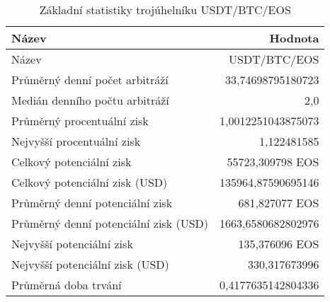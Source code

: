 \begin{table}\centering
\caption{Základní statistiky trojúhelníku USDT/BTC/EOS}
\label{USDTBTCEOS_stats}
\begin{tabular}{|| l | r ||}
\hline Název & Hodnota \\ 
\hline\hline Název & USDT/BTC/EOS \\ 
\hline Průměrný denní počet arbitráží & 33,74698795180723 \\ 
\hline Medián denního počtu arbitráží & 2,0 \\ 
\hline Průměrný procentuální zisk & 1,0012251043875073 \\ 
\hline Nejvyšší procentuální zisk & 1,122481585 \\ 
\hline Celkový potenciální zisk & 55723,309798 EOS \\ 
\hline Celkový potenciální zisk (USD) & 135964,87590695146 \\ 
\hline Průměrný denní potenciální zisk & 681,827077 EOS \\ 
\hline Průměrný denní potenciální zisk (USD) & 1663,6580682802976 \\ 
\hline Nejvyšší potenciální zisk & 135,376096 EOS \\ 
\hline Nejvyšší potenciální zisk (USD) & 330,317673996 \\ 
\hline Průměrná doba trvání & 0,4177635142804336 \\ 
\hline
\end{tabular}
\end{table}